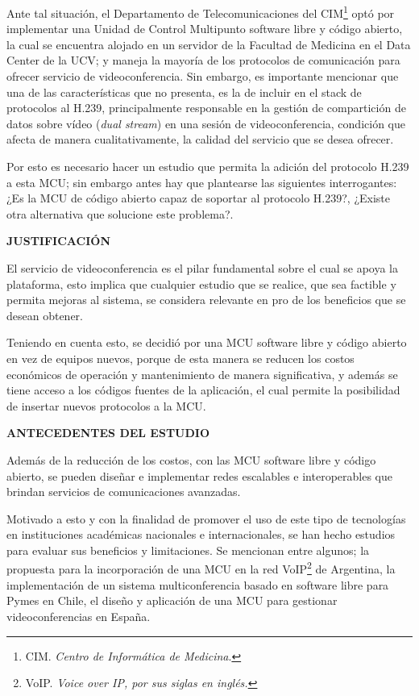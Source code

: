\documentclass[12pt,letterpaper]{article}
\begin{document}
Ante tal situación, el Departamento de Telecomunicaciones del CIM\footnote{CIM. \emph{Centro de Informática de Medicina}.} optó por implementar una Unidad de Control Multipunto software libre y código abierto, la cual se encuentra alojado en un servidor de la Facultad de Medicina en el Data Center de la UCV; y maneja la mayoría de los protocolos de comunicación para ofrecer servicio de videoconferencia. Sin embargo, es importante mencionar que una de las características que no presenta, es la de incluir en el stack de protocolos al H.239, principalmente responsable en la gestión de compartición de datos sobre vídeo (\emph{dual stream}) en una sesión de videoconferencia, condición que afecta de manera cualitativamente, la calidad del servicio que se desea ofrecer.

Por esto es necesario hacer un estudio que permita la adición del protocolo H.239 a esta MCU; sin embargo antes hay que plantearse las siguientes interrogantes: ¿Es la MCU de código abierto capaz de soportar al protocolo H.239?, ¿Existe otra alternativa que solucione este problema?.        

\centerline{\textbf{JUSTIFICACIÓN}}

El servicio de videoconferencia es el pilar fundamental sobre el cual se apoya la plataforma, esto implica que cualquier estudio que se realice, que sea factible y permita mejoras al sistema, se considera relevante en pro de los beneficios que se desean obtener.

Teniendo en cuenta esto, se decidió por una MCU software libre y código abierto en vez de equipos nuevos, porque de esta manera se reducen los costos económicos de operación y mantenimiento de manera significativa, y además se tiene acceso a los códigos fuentes de la aplicación, el cual permite la posibilidad de insertar nuevos protocolos a la MCU. 

\centerline{\textbf{ANTECEDENTES DEL ESTUDIO}}

Además de la reducción de los costos, con las MCU software libre y código abierto, se pueden diseñar e implementar redes escalables e interoperables que brindan servicios de comunicaciones avanzadas. 

Motivado a esto y con la finalidad de promover el uso de este tipo de tecnologías en instituciones académicas nacionales e internacionales, se han hecho estudios para evaluar sus beneficios y limitaciones. Se mencionan entre algunos; la propuesta para la incorporación de una MCU en la red VoIP\footnote{VoIP. \emph{Voice over IP, por sus siglas en inglés.}} de Argentina\cite{VoIP}, la implementación de un sistema multiconferencia basado en software libre\cite{inacap} para Pymes en Chile, el diseño y aplicación de una MCU para gestionar videoconferencias\cite{MCUAD} en España. 
\end{document}
